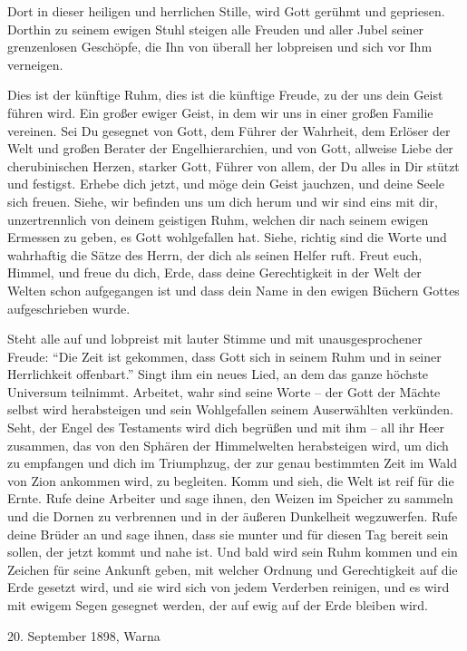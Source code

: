 Dort in dieser heiligen und herrlichen Stille, wird Gott gerühmt und gepriesen. Dorthin zu seinem ewigen Stuhl steigen alle Freuden und aller Jubel seiner grenzenlosen Geschöpfe, die Ihn von überall her lobpreisen und sich vor Ihm verneigen.

Dies ist der künftige Ruhm, dies ist die künftige Freude, zu der uns dein Geist führen wird. Ein großer ewiger Geist, in dem wir uns in einer großen Familie vereinen. Sei Du gesegnet von Gott, dem Führer der Wahrheit, dem Erlöser der Welt und großen Berater der Engelhierarchien, und von Gott, allweise Liebe der cherubinischen Herzen, starker Gott, Führer von allem, der Du alles in Dir stützt und festigst. Erhebe dich jetzt, und möge dein Geist jauchzen, und deine Seele sich freuen. Siehe, wir befinden uns um dich herum und wir sind eins mit dir, unzertrennlich von deinem geistigen Ruhm, welchen dir nach seinem ewigen Ermessen zu geben, es Gott wohlgefallen hat. Siehe, richtig sind die Worte und wahrhaftig die Sätze des Herrn, der dich als seinen Helfer ruft. Freut euch, Himmel, und freue du dich, Erde, dass deine Gerechtigkeit in der Welt der Welten schon aufgegangen ist und dass dein Name in den ewigen Büchern Gottes aufgeschrieben wurde. 

Steht alle auf und lobpreist mit lauter Stimme und mit unausgesprochener Freude: "`Die Zeit ist gekommen, dass Gott sich in seinem Ruhm und in seiner Herrlichkeit offenbart."' Singt ihm ein neues Lied, an dem das ganze höchste Universum teilnimmt. Arbeitet, wahr sind seine Worte -- der Gott der Mächte selbst wird herabsteigen und sein Wohlgefallen seinem Auserwählten verkünden. Seht, der Engel des Testaments wird dich begrüßen und mit ihm -- all ihr Heer zusammen, das von den Sphären der Himmelwelten herabsteigen wird, um dich zu empfangen und dich im Triumphzug, der zur genau bestimmten Zeit im Wald von Zion ankommen wird, zu begleiten. Komm und sieh, die Welt ist reif für die Ernte. Rufe deine Arbeiter und sage ihnen, den Weizen im Speicher zu sammeln und die Dornen zu verbrennen und in der äußeren Dunkelheit wegzuwerfen. Rufe deine Brüder an und sage ihnen, dass sie munter und für diesen Tag bereit sein sollen, der jetzt kommt und nahe ist. Und bald wird sein Ruhm kommen und ein Zeichen für seine Ankunft geben, mit welcher Ordnung und Gerechtigkeit auf die Erde gesetzt wird, und sie wird sich von jedem Verderben reinigen, und es wird mit ewigem Segen gesegnet werden, der auf ewig auf der Erde bleiben wird.

20. September 1898, Warna